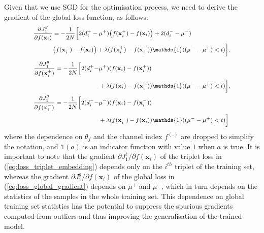 \documentclass[10pt,twocolumn,letterpaper]{article}
\begin{document}
Given that we use SGD for the optimisation process, we need to derive the gradient of the global loss function, as follows:
\begin{equation*}
\footnotesize{
\begin{split}
\frac {\partial  J_1^g}{\partial  f(\mathbf{x}_i)} &= -\frac{1}{2N}\Big[2(d_i^+ - \mu^+)\big(f(\mathbf{x}_i^+) - f(\mathbf{x}_i)\big)+ 2(d_i^- - \mu^-)\\
&\big(f(\mathbf{x}_i^-) - f(\mathbf{x}_i)\big) + \lambda (f(\mathbf{x}_i^+) - f(\mathbf{x}_i^-)) \mathds{1}((\mu^- - \mu^+) < t) \Big],\\
\end{split}}
\end{equation*}
\begin{equation}
\footnotesize{
\begin{split}
  \frac {\partial  J_1^g}{\partial  f(\mathbf{x}_i^+)} = -\frac{1}{2N}\Big[2(d_i^+ - &\mu^+)(f(\mathbf{x}_i) - f(\mathbf{x}_i^+)) \\
&+ \lambda (f(\mathbf{x}_i ) - f(\mathbf{x}_i^+))\mathds{1}((\mu^- - \mu^+) < t) \Big],\\ 
 \frac {\partial  J_1^g}{\partial  f(\mathbf{x}_i^-)} = -\frac{1}{2N}\Big[2(d_i^- - &\mu^-)(f(\mathbf{x}_i) - f(\mathbf{x}_i^-)) \\
&+ \lambda (f(\mathbf{x}_i^-) - f(\mathbf{x}_i))\mathds{1}((\mu^- - \mu^+) < t) \Big]\\
 \label{eq:loss_global_gradient}
 \end{split}}
\end{equation}
where 
the dependence on $\theta_f$ and the channel index $f^{(.)}$ are dropped to simplify the notation, and $\mathds{1}(a)$ is an indicator function with value $1$ when $a$ is true. It is important to note that the gradient 
${\partial  J_1^t}{/ \partial  f(\mathbf{x}_i)}$ of the triplet loss in (\ref{eq:loss_triplet_embedding}) depends only on the $i^{th}$
triplet of the training set, whereas the gradient ${\partial  J_1^g}{/ \partial  f(\mathbf{x}_i)} $ of the global loss in (\ref{eq:loss_global_gradient})
depends on $\mu^+$ and $\mu^-$, which in turn depends on the statistics of the samples in the whole training set. This dependence on global training set statistics has the potential to suppress the spurious gradients
computed from outliers and thus improving the generalisation of the trained model.
\end{document}
